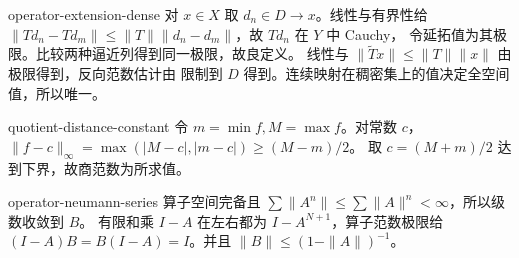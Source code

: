 \begin{solution}{operator-extension-dense}
对 \(x\in X\) 取 \(d_n\in D\to x\)。线性与有界性给
\(\|Td_n-Td_m\|\le\|T\|\|d_n-d_m\|\)，故 \(Td_n\) 在 \(Y\) 中 Cauchy，
令延拓值为其极限。比较两种逼近列得到同一极限，故良定义。
线性与 \(\|\widetilde Tx\|\le\|T\|\|x\|\) 由极限得到，反向范数估计由
限制到 \(D\) 得到。连续映射在稠密集上的值决定全空间值，所以唯一。
\end{solution}
\begin{solution}{quotient-distance-constant}
令 \(m=\min f,M=\max f\)。对常数 \(c\)，
\(\|f-c\|_\infty=\max(|M-c|,|m-c|)\ge(M-m)/2\)。
取 \(c=(M+m)/2\) 达到下界，故商范数为所求值。
\end{solution}
\begin{solution}{operator-neumann-series}
算子空间完备且 \(\sum\|A^n\|\le\sum\|A\|^n<\infty\)，所以级数收敛到 \(B\)。
有限和乘 \(I-A\) 在左右都为 \(I-A^{N+1}\)，算子范数极限给
\((I-A)B=B(I-A)=I\)。并且 \(\|B\|\le(1-\|A\|)^{-1}\)。
\end{solution}
